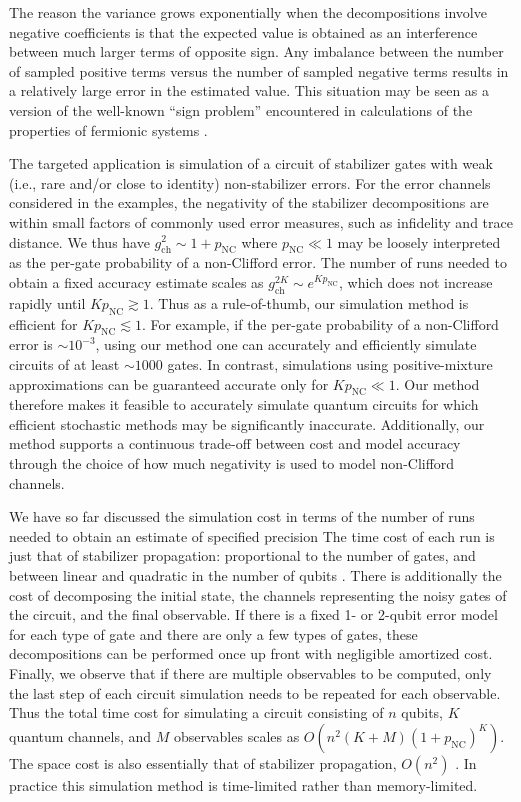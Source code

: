 \documentclass[twocolumn,pra]{revtex4}
\begin{document}
The reason the variance grows exponentially when the decompositions involve negative coefficients is that the expected value is obtained as an interference between much larger terms of opposite sign.
Any imbalance between the number of sampled positive terms versus the number of sampled negative terms results in a relatively large error in the estimated value.
This situation may be seen as a version of the well-known ``sign problem'' encountered in calculations of the properties of fermionic systems \cite{Troyer2005}.
\par
The targeted application is simulation of a circuit of stabilizer gates with weak (i.e., rare and/or close to identity) non-stabilizer errors. For the error channels considered in the examples, the negativity of the stabilizer decompositions are within small factors of commonly used error measures, such as infidelity and trace distance. We thus have $g_{\text{ch}}^2 \sim 1 + p_{\text{NC}}$ where $p_{\text{NC}} \ll 1$ may be loosely interpreted as  the per-gate probability of a non-Clifford error. The number of runs needed to obtain a fixed accuracy estimate scales as $g_{\text{ch}}^{2K} \sim e^{K p_{\text{NC}}}$, which does not increase rapidly until $K  p_{\text{NC}} \gtrsim 1$. Thus as a rule-of-thumb, our simulation method is efficient for $K p_{\text{NC}} \lesssim 1$. For example, if the per-gate probability of a non-Clifford error is $\sim10^{-3}$, using our method one can accurately and efficiently simulate circuits of at least $\sim1000$ gates. In contrast, simulations using positive-mixture approximations can be guaranteed accurate only for $K p_{\text{NC}} \ll 1$. Our method therefore makes it feasible to accurately simulate quantum circuits for which efficient stochastic methods may be significantly inaccurate. Additionally, our method supports a continuous trade-off between cost and model accuracy through the choice of how much negativity is used to model non-Clifford channels.
\par
We have so far discussed the simulation cost in terms of the number of runs needed to obtain an estimate of specified precision The time cost of each run is just that of stabilizer propagation: proportional to the number of gates, and between linear and quadratic in the number of qubits \cite{Aaronson2004}. There is additionally the cost of decomposing the initial state, the channels representing the noisy gates of the circuit, and the final observable. If there is a fixed 1- or 2-qubit error model for each type of gate and there are only a few types of gates, these decompositions can be performed once up front with negligible amortized cost. Finally, we observe that if there are multiple observables to be computed, only the last step of each circuit simulation needs to be repeated for each observable. Thus the total time cost for simulating a circuit consisting of $n$ qubits, $K$ quantum channels, and $M$ observables scales as $O(n^2 (K + M) (1+p_{\text{NC}})^{K})$. The space cost is also essentially that of stabilizer propagation, $O(n^2)$ \cite{gottesman1998heisenberg}. In practice this simulation method is time-limited rather than memory-limited.
\end{document}
